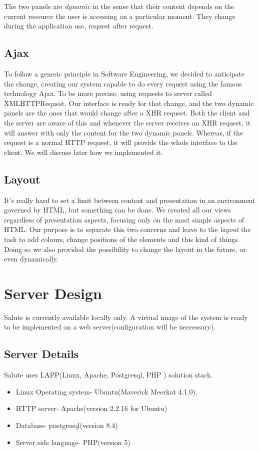 \documentclass[12pt]{report}
\begin{document}
The two panels are \emph{dynamic} in the sense that their content depends on the current resource the user is accessing on a particular moment. They change during the application use, request after request.

\subsection{Ajax}
To follow a generic principle in Software Engineering, we decided to anticipate the change, creating our system capable to do every request using the famous technology Ajax. To be more precise, using requests to server called XMLHTTPRequest. Our interface is ready for that change, and the two dynamic panels are the ones that would change after a XHR request. Both the client and the server are aware of this and whenever the server receives an XHR request, it will answer with only the content for the two dynamic panels. Whereas, if the request is a normal HTTP request, it will provide the whole interface to the client. We will discuss later how we implemented it.

\subsection{Layout}
It's really hard to set a limit between content and presentation in an environment governed by HTML, but something can be done. We created all our views regardless of presentation aspects, focusing only on the most simple aspects of HTML. Our purpose is to separate this two concerns and leave to the \emph{layout} the task to add colours, change positions of the elements and this kind of things. Doing so we also provided the possibility to change the layout in the future, or even dynamically.

\section{Server Design}
Salute is currently available locally only. A virtual image of the system is ready to be implemented on a web server(configuration will be neccessary).

\subsection{Server Details}
Salute uses LAPP(Linux, Apache, Postgresql, PHP ) solution stack.
\begin{itemize}
\item Linux Operating system- Ubuntu(Maverick Meerkat 4.1.0). 
\item HTTP server- Apache(version 2.2.16 for Ubuntu)
\item Database- postgresql(version 8.4)
\item Server side language- PHP(version 5)
\end{itemize}
\end{document}
